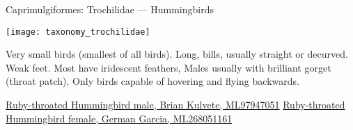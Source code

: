 \documentclass[t]{beamer}
\begin{document}
\begin{frame}[t]{Caprimulgiformes: Trochilidae — Hummingbirds}
\vspace{-0.5\baselineskip}


\texttt{[image: taxonomy\_trochilidae]}

\hangpara Very small birds (smallest of all birds). Long,  bills, usually straight or decurved. Weak feet. Most have iridescent feathers, Males usually with brilliant gorget (throat patch). Only birds capable of hovering and flying backwards.

\vfilll

\tiny \href{https://macaulaylibrary.org/asset/97947051}{Ruby-throated Hummingbird male, Brian Kulvete, ML97947051} \hfill  \href{https://macaulaylibrary.org/asset/268051161}{Ruby-throated Hummingbird female, German Garcia, ML268051161}

\end{frame}
\end{document}
